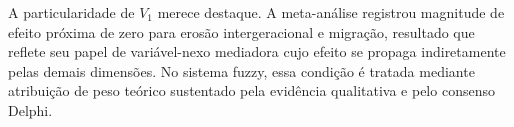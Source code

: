 A particularidade de $V_1$ merece destaque. A meta-análise registrou magnitude de efeito próxima de zero para erosão intergeracional e migração, resultado que reflete seu papel de variável-nexo mediadora cujo efeito se propaga indiretamente pelas demais dimensões. No sistema fuzzy, essa condição é tratada mediante atribuição de peso teórico sustentado pela evidência qualitativa e pelo consenso Delphi.















